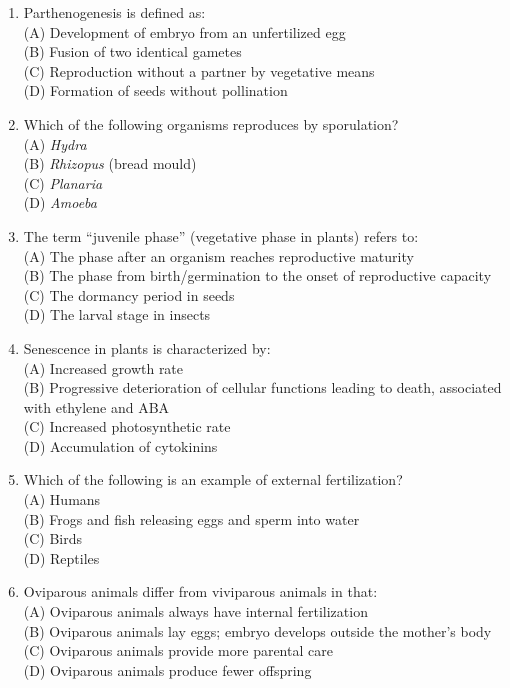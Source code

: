 \documentclass{article}
\begin{document}
\begin{enumerate}[label=Q\arabic*.]
\item Parthenogenesis is defined as:
\\(A) Development of embryo from an unfertilized egg
\\(B) Fusion of two identical gametes
\\(C) Reproduction without a partner by vegetative means
\\(D) Formation of seeds without pollination

\item Which of the following organisms reproduces by sporulation?
\\(A) \textit{Hydra}
\\(B) \textit{Rhizopus} (bread mould)
\\(C) \textit{Planaria}
\\(D) \textit{Amoeba}

\item The term ``juvenile phase'' (vegetative phase in plants) refers to:
\\(A) The phase after an organism reaches reproductive maturity
\\(B) The phase from birth/germination to the onset of reproductive capacity
\\(C) The dormancy period in seeds
\\(D) The larval stage in insects

\item Senescence in plants is characterized by:
\\(A) Increased growth rate
\\(B) Progressive deterioration of cellular functions leading to death, associated with ethylene and ABA
\\(C) Increased photosynthetic rate
\\(D) Accumulation of cytokinins

\item Which of the following is an example of external fertilization?
\\(A) Humans
\\(B) Frogs and fish releasing eggs and sperm into water
\\(C) Birds
\\(D) Reptiles

\item Oviparous animals differ from viviparous animals in that:
\\(A) Oviparous animals always have internal fertilization
\\(B) Oviparous animals lay eggs; embryo develops outside the mother's body
\\(C) Oviparous animals provide more parental care
\\(D) Oviparous animals produce fewer offspring


\end{enumerate}
\end{document}
